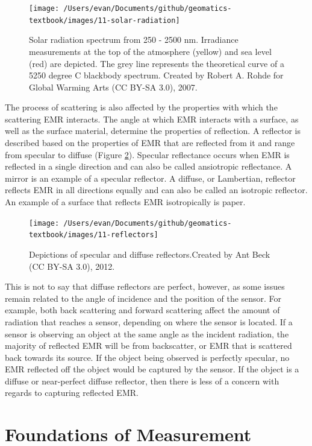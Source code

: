 \documentclass[
]{book}
\begin{document}
\begin{figure}
\texttt{[image: /Users/evan/Documents/github/geomatics-textbook/images/11-solar-radiation]} \caption{Solar radiation spectrum from 250 - 2500 nm. Irradiance measurements at the top of the atmosphere (yellow) and sea level (red) are depicted. The grey line represents the theoretical curve of a 5250 degree C blackbody spectrum. Created by Robert A. Rohde for Global
Warming Arts (CC BY-SA 3.0), 2007.}\label{fig:11-solar-radiation}
\end{figure}

The process of scattering is also affected by the properties with which
the scattering EMR interacts. The angle at which EMR interacts with a
surface, as well as the surface material, determine the properties of
reflection. A reflector is described based on the properties of EMR that
are reflected from it and range from specular to diffuse (Figure
\ref{fig:11-reflectors}). Specular reflectance occurs when EMR is
reflected in a single direction and can also be called ansiotropic
reflectance. A mirror is an example of a specular reflector. A diffuse,
or Lambertian, reflector reflects EMR in all directions equally and can
also be called an isotropic reflector. An example of a surface that
reflects EMR isotropically is paper.

\begin{figure}
\texttt{[image: /Users/evan/Documents/github/geomatics-textbook/images/11-reflectors]} \caption{Depictions of specular and diffuse reflectors.Created by Ant Beck (CC BY-SA 3.0), 2012.}\label{fig:11-reflectors}
\end{figure}

This is not to say that diffuse reflectors are perfect, however, as some
issues remain related to the angle of incidence and the position of the
sensor. For example, both back scattering and forward scattering affect
the amount of radiation that reaches a sensor, depending on where the
sensor is located. If a sensor is observing an object at the same angle
as the incident radiation, the majority of reflected EMR will be from
backscatter, or EMR that is scattered back towards its source. If the
object being observed is perfectly specular, no EMR reflected off the
object would be captured by the sensor. If the object is a diffuse or
near-perfect diffuse reflector, then there is less of a concern with
regards to capturing reflected EMR.

\hypertarget{foundations-of-measurement}{%
\section{Foundations of Measurement}\label{foundations-of-measurement}}
\end{document}

